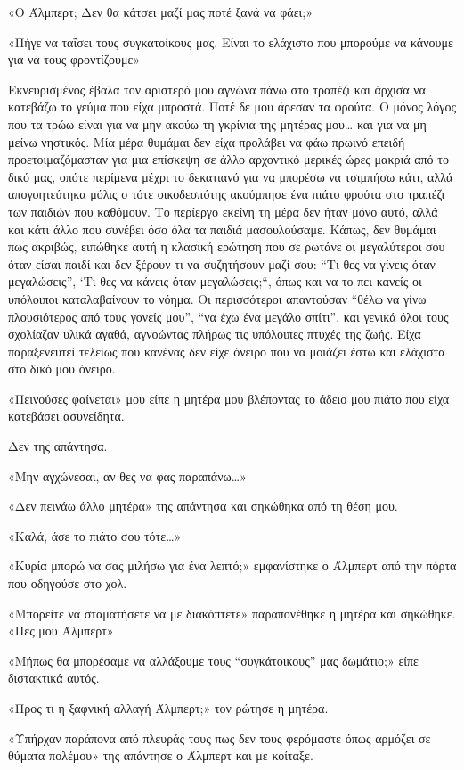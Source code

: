 \documentclass[12pt,twoside, openany]{book}
\begin{document}
«Ο Άλμπερτ; Δεν θα κάτσει μαζί μας ποτέ ξανά να φάει;»

«Πήγε να ταΐσει τους συγκατοίκους μας. Είναι το ελάχιστο που μπορούμε να κάνουμε για να τους φροντίζουμε»

Εκνευρισμένος έβαλα τον αριστερό μου αγνώνα πάνω στο τραπέζι και άρχισα να κατεβάζω το γεύμα που είχα μπροστά. Ποτέ δε μου άρεσαν τα φρούτα. Ο μόνος λόγος που τα τρώω είναι για να μην ακούω τη γκρίνια της μητέρας μου… και για να μη μείνω νηστικός. Μία μέρα θυμάμαι δεν είχα προλάβει να φάω πρωινό επειδή προετοιμαζόμασταν για μια επίσκεψη σε άλλο αρχοντικό μερικές ώρες μακριά από το δικό μας, οπότε περίμενα μέχρι το δεκατιανό για να μπορέσω να τσιμπήσω κάτι, αλλά απογοητεύτηκα μόλις ο τότε οικοδεσπότης ακούμπησε ένα πιάτο φρούτα στο τραπέζι των παιδιών που καθόμουν. Το περίεργο εκείνη τη μέρα δεν ήταν μόνο αυτό, αλλά και κάτι άλλο που συνέβει όσο όλα τα παιδιά μασουλούσαμε. Κάπως, δεν θυμάμαι πως ακριβώς, ειπώθηκε αυτή η κλασική ερώτηση που σε ρωτάνε οι μεγαλύτεροι σου όταν είσαι παιδί και δεν ξέρουν τι να συζητήσουν μαζί σου: “Τι θες να γίνεις όταν μεγαλώσεις”, ‘Τι θες να κάνεις όταν μεγαλώσεις;“, όπως και να το πει κανείς οι υπόλοιποι καταλαβαίνουν το νόημα. Οι περισσότεροι απαντούσαν “θέλω να γίνω πλουσιότερος από τους γονείς μου”, “να έχω ένα μεγάλο σπίτι”, και γενικά όλοι τους σχολίαζαν υλικά αγαθά, αγνοώντας πλήρως τις υπόλοιπες πτυχές της ζωής. Είχα παραξενευτεί τελείως που κανένας δεν είχε όνειρο που να μοιάζει έστω και ελάχιστα στο δικό μου όνειρο.

«Πεινούσες φαίνεται» μου είπε η μητέρα μου βλέποντας το άδειο μου πιάτο που είχα κατεβάσει ασυνείδητα.

Δεν της απάντησα.

«Μην αγχώνεσαι, αν θες να φας παραπάνω…»

«Δεν πεινάω άλλο μητέρα» της απάντησα και σηκώθηκα από τη θέση μου.

«Καλά, άσε το πιάτο σου τότε…»

«Κυρία μπορώ να σας μιλήσω για ένα λεπτό;» εμφανίστηκε ο Άλμπερτ από την πόρτα που οδηγούσε στο χολ.

«Μπορείτε να σταματήσετε να με διακόπτετε» παραπονέθηκε η μητέρα και σηκώθηκε. «Πες μου Άλμπερτ»

«Μήπως θα μπορέσαμε να αλλάξουμε τους “συγκάτοικους” μας δωμάτιο;» είπε διστακτικά αυτός.

«Προς τι η ξαφνική αλλαγή Άλμπερτ;» τον ρώτησε η μητέρα.

«Υπήρχαν παράπονα από πλευράς τους πως δεν τους φερόμαστε όπως αρμόζει σε θύματα πολέμου» της απάντησε ο Άλμπερτ και με κοίταξε.
\end{document}
